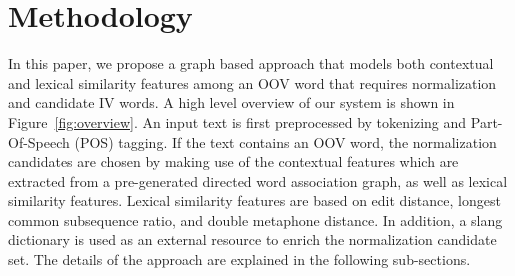 \documentclass[preprint,review,12pt]{elsarticle}
\begin{document}


\section{Methodology}
\label{sec:method}



In this paper, we propose a graph based approach that models both contextual and lexical similarity features among an OOV word that requires normalization and candidate IV words. A high level overview of our system is shown in Figure~\ref{fig:overview}. An input text is first preprocessed by tokenizing and Part-Of-Speech (POS) tagging. If the text contains an OOV word, the normalization candidates are chosen by making use of the contextual features which are extracted from a pre-generated directed word association graph, as well as lexical similarity features. Lexical similarity features are based on edit distance, longest common subsequence ratio, and double metaphone distance. In addition, a slang dictionary is used as an external resource to enrich the normalization candidate set. The details of the approach are explained in the following sub-sections.
\end{document}
